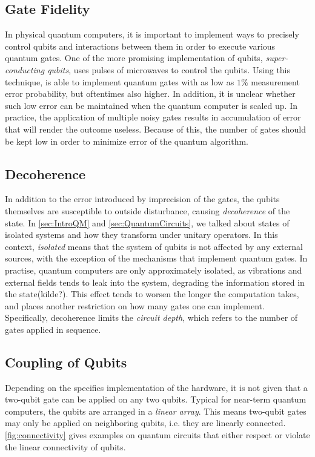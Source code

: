 \subsection{Gate Fidelity}\label{sec:GateFidelity}
In physical quantum computers, it is important to implement ways to precisely control qubits and interactions between them in order to execute various quantum gates. One of the more promising implementation of qubits, \emph{super-conducting qubits}, uses pulses of microwaves to control the qubits. Using this technique, \citet{Barends_2014} is able to implement quantum gates with as low as $1\%$ measurement error probability, but oftentimes also higher. In addition, it is unclear whether such low error can be maintained when the quantum computer is scaled up. In practice, the application of multiple noisy gates results in accumulation of error that will render the outcome useless\cite{Preskill_2018}. Because of this, the number of gates should be kept low in order to minimize error of the quantum algorithm. 

\subsection{Decoherence}\label{sec:DaEC}
In addition to the error introduced by imprecision of the gates, the qubits themselves are susceptible to outside disturbance, causing \emph{decoherence} of the state. In \autoref{sec:IntroQM} and \autoref{sec:QuantumCircuits}, we talked about states of isolated systems and how they transform under unitary operators. In this context, \emph{isolated} means that the system of qubits is not affected by any external sources, with the exception of the mechanisms that implement quantum gates. In practise, quantum computers are only approximately isolated, as vibrations and external fields tends to leak into the system, degrading the information stored in the state(kilde?). This effect tends to worsen the longer the computation takes, and places another restriction on how many gates one can implement. Specifically, decoherence limits the \emph{circuit depth}, which refers to the number of gates applied in sequence. 

\subsection{Coupling of Qubits}\label{sec:CoQ}
Depending on the specifics implementation of the hardware, it is not given that a two-qubit gate can be applied on any two qubits. Typical for near-term quantum computers, the qubits are arranged in a \emph{linear array}\cite{Holmes_2020}. This means two-qubit gates may only be applied on neighboring qubits, i.e. they are linearly connected. \autoref{fig:connectivity} gives examples on quantum circuits that either respect or violate the linear connectivity of qubits.     

